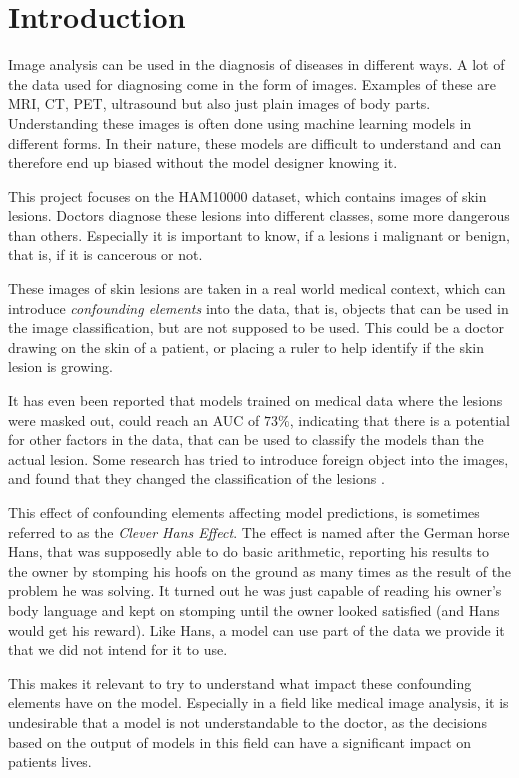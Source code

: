 \chapter{Introduction}\label{sec:introduction}
Image analysis can be used in the diagnosis of diseases in different ways.
A lot of the data used for diagnosing come in the form of images.
Examples of these are MRI, CT, PET, ultrasound but also just plain images of body parts.
Understanding these images is often done using machine learning models in different forms.
In their nature, these models are difficult to understand and can therefore end up biased without
the model designer knowing it.

This project focuses on the HAM10000 dataset\cite{Tschandl_2018}, which contains images of skin lesions.
Doctors diagnose these lesions into different classes, some more dangerous than others.
Especially it is important to know,
if a lesions i malignant or benign,
that is, if it is cancerous or not.

These images of skin lesions are taken in a real world medical context,
which can introduce \textit{confounding elements} into the data,
that is, objects that can be used in the image classification,
but are not supposed to be used.
This could be a doctor drawing on the skin of a patient,
or placing a ruler to help identify if the skin lesion is growing.

It has even been reported that models trained on medical data where the lesions were masked out,
could reach an AUC of $73\%$\cite{DeConstructing_Bias_on_Skin_Lesion_Datasets_2019},
indicating that there is a potential for other factors in the data,
that can be used to classify the models than the actual lesion.
Some research has tried to introduce foreign object into the images,
and found that they changed the classification of the lesions \cite{Towards_Explainable_Classifiers_Using_the_Counterfactual_Approach_2019}.

This effect of confounding elements affecting model predictions, 
is sometimes referred to as the \textit{Clever Hans Effect}.
The effect is named after the German horse Hans,
that was supposedly able to do basic arithmetic,
reporting his results to the owner by stomping his hoofs on the ground as many times as the result of the problem he was solving.
It turned out he was just capable of reading his owner's body language and kept on stomping until the owner looked satisfied (and Hans would get his reward).
Like Hans, a model can use part of the data we provide it that we did not intend for it to use.

This makes it relevant to try to understand what impact these confounding elements have on the model.
Especially in a field like medical image analysis,
it is undesirable that a model is not understandable to the doctor,
as the decisions based on the output of models in this field can have a significant impact on patients lives.